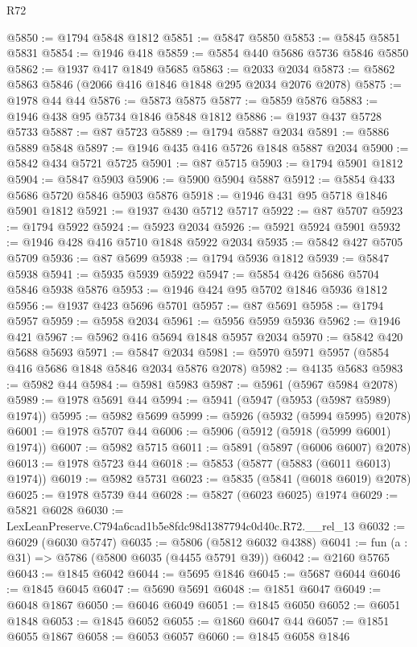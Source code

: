 \begin{lexlean}{R72}
\begin{coremodule}
@5850 := @1794 @5848 @1812
@5851 := @5847 @5850
@5853 := @5845 @5851 @5831
@5854 := @1946 @418
@5859 := @5854 @440 @5686 @5736 @5846 @5850
@5862 := @1937 @417 @1849 @5685
@5863 := @2033 @2034
@5873 := @5862 @5863 @5846 (@2066 @416 @1846 @1848 @295 @2034 @2076 @2078)
@5875 := @1978 @44 @44
@5876 := @5873 @5875
@5877 := @5859 @5876
@5883 := @1946 @438 @95 @5734 @1846 @5848 @1812
@5886 := @1937 @437 @5728 @5733
@5887 := @87 @5723
@5889 := @1794 @5887 @2034
@5891 := @5886 @5889 @5848
@5897 := @1946 @435 @416 @5726 @1848 @5887 @2034
@5900 := @5842 @434 @5721 @5725
@5901 := @87 @5715
@5903 := @1794 @5901 @1812
@5904 := @5847 @5903
@5906 := @5900 @5904 @5887
@5912 := @5854 @433 @5686 @5720 @5846 @5903 @5876
@5918 := @1946 @431 @95 @5718 @1846 @5901 @1812
@5921 := @1937 @430 @5712 @5717
@5922 := @87 @5707
@5923 := @1794 @5922
@5924 := @5923 @2034
@5926 := @5921 @5924 @5901
@5932 := @1946 @428 @416 @5710 @1848 @5922 @2034
@5935 := @5842 @427 @5705 @5709
@5936 := @87 @5699
@5938 := @1794 @5936 @1812
@5939 := @5847 @5938
@5941 := @5935 @5939 @5922
@5947 := @5854 @426 @5686 @5704 @5846 @5938 @5876
@5953 := @1946 @424 @95 @5702 @1846 @5936 @1812
@5956 := @1937 @423 @5696 @5701
@5957 := @87 @5691
@5958 := @1794 @5957
@5959 := @5958 @2034
@5961 := @5956 @5959 @5936
@5962 := @1946 @421
@5967 := @5962 @416 @5694 @1848 @5957 @2034
@5970 := @5842 @420 @5688 @5693
@5971 := @5847 @2034
@5981 := @5970 @5971 @5957 (@5854 @416 @5686 @1848 @5846 @2034 @5876 @2078)
@5982 := @4135 @5683
@5983 := @5982 @44
@5984 := @5981 @5983
@5987 := @5961 (@5967 @5984 @2078)
@5989 := @1978 @5691 @44
@5994 := @5941 (@5947 (@5953 (@5987 @5989) @1974))
@5995 := @5982 @5699
@5999 := @5926 (@5932 (@5994 @5995) @2078)
@6001 := @1978 @5707 @44
@6006 := @5906 (@5912 (@5918 (@5999 @6001) @1974))
@6007 := @5982 @5715
@6011 := @5891 (@5897 (@6006 @6007) @2078)
@6013 := @1978 @5723 @44
@6018 := @5853 (@5877 (@5883 (@6011 @6013) @1974))
@6019 := @5982 @5731
@6023 := @5835 (@5841 (@6018 @6019) @2078)
@6025 := @1978 @5739 @44
@6028 := @5827 (@6023 @6025) @1974
@6029 := @5821 @6028
@6030 := LexLeanPreserve.C794a6cad1b5e8fdc98d1387794c0d40c.R72.__rel_13
@6032 := @6029 (@6030 @5747)
@6035 := @5806 (@5812 @6032 @4388)
@6041 := fun (a : @31) => @5786 (@5800 @6035 (@4455 @5791 @39))
@6042 := @2160 @5765
@6043 := @1845 @6042
@6044 := @5695 @1846
@6045 := @5687 @6044
@6046 := @1845 @6045
@6047 := @5690 @5691
@6048 := @1851 @6047
@6049 := @6048 @1867
@6050 := @6046 @6049
@6051 := @1845 @6050
@6052 := @6051 @1848
@6053 := @1845 @6052
@6055 := @1860 @6047 @44
@6057 := @1851 @6055 @1867
@6058 := @6053 @6057
@6060 := @1845 @6058 @1846

\end{coremodule}
\end{lexlean}
